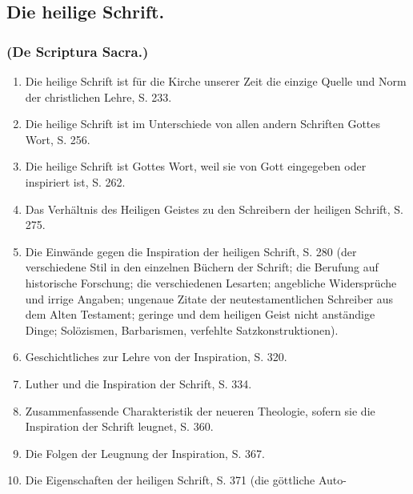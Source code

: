 \subsection*{Die heilige Schrift.}
\subsubsection*{\normalfont (De Scriptura Sacra.)}

\begin{enumerate}
\item Die heilige Schrift ist für die Kirche unserer Zeit die einzige Quelle und Norm der christlichen Lehre, S. 233.
\item Die heilige Schrift ist im Unterschiede von allen andern Schriften Gottes Wort, S. 256.
\item Die heilige Schrift ist Gottes Wort, weil sie von Gott eingegeben oder inspiriert ist, S. 262.
\item Das Verhältnis des Heiligen Geistes zu den Schreibern der heiligen Schrift, S. 275.
\item Die Einwände gegen die Inspiration der heiligen Schrift, S. 280 (der verschiedene Stil in den einzelnen Büchern der Schrift; die Berufung auf historische Forschung; die verschiedenen Lesarten; angebliche Widersprüche und irrige Angaben; ungenaue Zitate der neutestamentlichen Schreiber aus dem Alten Testament; geringe und dem heiligen Geist nicht anständige Dinge; Solözismen, Barbarismen, verfehlte Satzkonstruktionen).
\item Geschichtliches zur Lehre von der Inspiration, S. 320.
\item Luther und die Inspiration der Schrift, S. 334.
\item Zusammenfassende Charakteristik der neueren Theologie, sofern sie die Inspiration der Schrift leugnet, S. 360.
\item Die Folgen der Leugnung der Inspiration, S. 367.
\item Die Eigenschaften der heiligen Schrift, S. 371 (die göttliche Auto-
\end{enumerate}